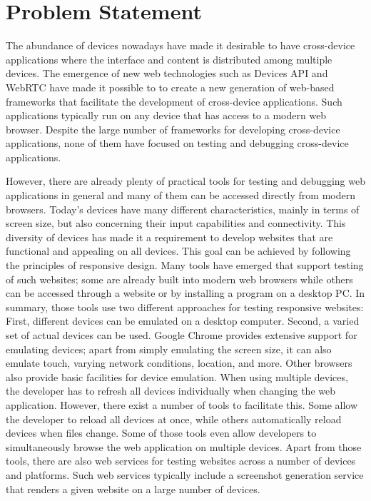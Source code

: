 \section{Problem Statement}

The abundance of devices nowadays have made it desirable to have cross-device applications where the interface and content is distributed among multiple devices. The emergence of new web technologies such as Devices API and WebRTC have made it possible to to create a new generation of web-based frameworks that facilitate the development of cross-device applications. Such applications typically run on any device that has access to a modern web browser. Despite the large number of frameworks for developing cross-device applications, none of them have focused on testing and debugging cross-device applications.

However, there are already plenty of practical tools for testing and debugging web applications in general and many of them can be accessed directly from modern browsers. Today's devices have many different characteristics, mainly in terms of screen size, but also concerning their input capabilities and connectivity. This diversity of devices has made it a requirement to develop websites that are functional and appealing on all devices. This goal can be achieved by following the principles of responsive design. Many tools have emerged that support testing of such websites; some are already built into modern web browsers while others can be accessed through a website or by installing a program on a desktop PC. In summary, those tools use two different approaches for testing responsive websites: First, different devices can be emulated on a desktop computer. Second, a varied set of actual devices can be used. Google Chrome provides extensive support for emulating devices; apart from simply emulating the screen size, it can also emulate touch, varying network conditions, location, and more. Other browsers also provide basic facilities for device emulation. When using multiple devices, the developer has to refresh all devices individually when changing the web application. However, there exist a number of tools to facilitate this. Some allow the developer to reload all devices at once, while others automatically reload devices when files change. Some of those tools even allow developers to simultaneously browse the web application on multiple devices. Apart from those tools, there are also web services for testing websites across a number of devices and platforms. Such web services typically include a screenshot generation service that renders a given website on a large number of devices.

